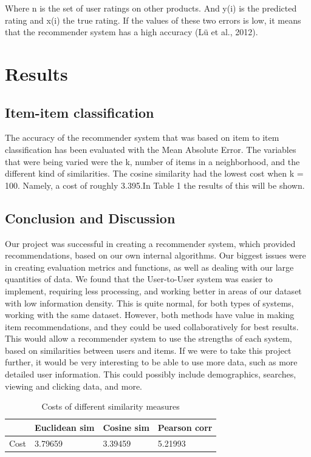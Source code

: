 \documentclass[11pt]{article}
\begin{document}
Where n is the set of user ratings on other products. And y(i) is the predicted rating and x(i)  the true rating. 
If the values of these two errors is low, it means that the recommender system has a high accuracy (Lü et al., 2012). 

\section{Results}
\subsection{Item-item classification}
The accuracy of the recommender system that was based on item to item classification has been evaluated with the Mean Absolute Error. The variables that were being varied were the k, number of items in a neighborhood, and the different kind of similarities. The cosine similarity had the lowest cost when k = 100. Namely, a cost of roughly 3.395.In Table 1 the results of this will be shown.\\

\subsection{Conclusion and Discussion}
Our project was successful in creating a recommender system, which provided recommendations, based on our own internal algorithms. Our biggest issues were in creating evaluation metrics and functions, as well as dealing with our large quantities of data. We found that the User-to-User system was easier to implement, requiring less processing, and working better in areas of our dataset with low information density. This is quite normal, for both types of systems, working with the same dataset. However, both methods have value in making item recommendations, and they could be used collaboratively for best results. This would allow a recommender system to use the strengths of each system, based on similarities between users and items. If we were to take this project further, it would be very interesting to be able to use more data, such as more detailed user information. This could possibly include demographics, searches, viewing and clicking data, and more.
 
\newpage

\begin{table}[]
\begin{tabular}{@{}|l|l|l|l|@{}}
\toprule
     & Euclidean sim & Cosine sim & Pearson corr \\ \midrule
Cost & 3.79659              & 3.39459           & 5.21993             \\ \bottomrule
\end{tabular}
\caption{Costs of different similarity measures}
\end{table}
\end{document}
